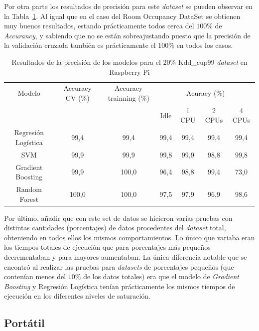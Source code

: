 \documentclass[a4paper, 12pt]{book}
\begin{document}
Por otra parte los resultados de precisión para este \textit{dataset} se pueden observar en la Tabla~\ref{tab:acc_Kddraspberry}. Al igual que en el caso del Room Occupancy DataSet se obtienen muy buenos resultados, estando prácticamente todos cerca del $100\%$ de \textit{Accurancy}, y sabiendo que no se están sobreajustando puesto que la precisión de la validación cruzada también es prácticamente el $100\%$ en todos los casos.\\
\begin{table}[htb]
\renewcommand{\arraystretch}{1.5}
\begin{adjustbox}{width=\textwidth}
\centering
    \begin{tabular}{c  c  c  c  c  c  c}
    \hline
    Modelo & Accuracy CV (\%) & Accuracy trainning (\%) & \multicolumn{4}{c}{Acuracy (\%)} \\
    \cline{4-7}
     &  &   &  Idle & 1 CPU & 2 CPUs & 4 CPUs \\
     \hline
     Regresión Logística & 99,4 & 99,4 & 99,4 & 99,4 & 99,4 & 99,4\\
     SVM & 99,9 & 99,9 & 99,8 & 99,9 & 98,8 & 99,8\\
     Gradient Boosting & 99,9 & 100,0 & 96,4 & 98,8 & 99,4 & 73,0\\
     Random Forest & 100,0 & 100,0 & 97,5 & 97,9 & 96,9 & 98,6\\
    \hline
    \end{tabular}
\end{adjustbox}
\caption{Resultados de la precisión de los modelos para el $20$\% Kdd\_cup99 \textit{dataset} en Raspberry Pi}
\label{tab:acc_Kddraspberry}
\end{table}

Por último, añadir que con este set de datos se hicieron varias pruebas con distintas cantidades (porcentajes) de datos procedentes del \textit{dataset} total, obteniendo en todos ellos los mismos comportamientos. Lo único que variaba eran los tiempos totales de ejecución que para porcentajes más pequeños decrementaban y para mayores aumentaban. La única diferencia notable que se encontró al realizar las pruebas para \textit{datasets} de porcentajes pequeños (que contenían menos del $10\%$ de los datos totales) era que el modelo de \textit{Gradient Boosting} y Regresión Logística tenían prácticamente los mismos tiempos de ejecución en los diferentes niveles de saturación.

\subsection{Portátil}
\label{subsec:pc_sinteticos}
\end{document}
